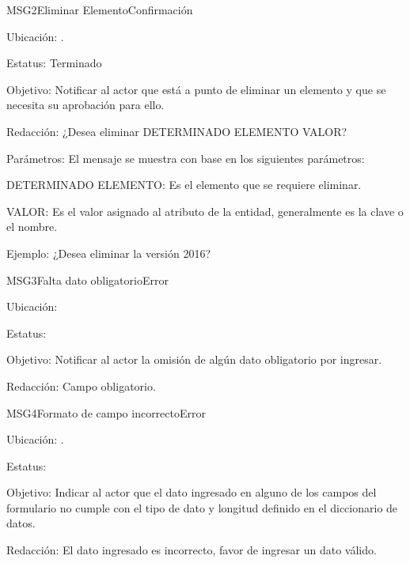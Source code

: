 \begin{mensaje}{MSG2}{Eliminar Elemento}{Confirmación}
	\item[Ubicación:] \msjEmergente.
	\item[Estatus:] Terminado
	\item[Objetivo:] Notificar al actor que está a punto de eliminar un elemento y que se necesita su aprobación para ello.
	\item[Redacción:] ¿Desea eliminar DETERMINADO ELEMENTO VALOR?
	\item[Parámetros:] El mensaje se muestra con base en los siguientes parámetros:
	\begin{Citemize} 
		\item DETERMINADO ELEMENTO: Es el elemento que se requiere eliminar.
		\item VALOR: Es el valor asignado al atributo de la entidad, generalmente es la clave o el nombre.
	\end{Citemize}
	\item[Ejemplo:] ¿Desea eliminar la versión 2016?
\end{mensaje}


\begin{mensaje}{MSG3}{Falta dato obligatorio}{Error}
	\item[Ubicación:] \msjCampo
	\item[Estatus:] %
	\item[Objetivo:] Notificar al actor la omisión de algún dato obligatorio por ingresar.
	\item[Redacción:] Campo obligatorio.

\end{mensaje}

\begin{mensaje}{MSG4}{Formato de campo incorrecto}{Error}
	\item[Ubicación:] \msjCampo.
	\item[Estatus:] %
	\item[Objetivo:] Indicar al actor que el dato ingresado en alguno de los campos del formulario no cumple con el tipo de dato y longitud definido en el diccionario de datos.
	\item[Redacción:] El dato ingresado es incorrecto, favor de ingresar un dato válido.

\end{mensaje}


